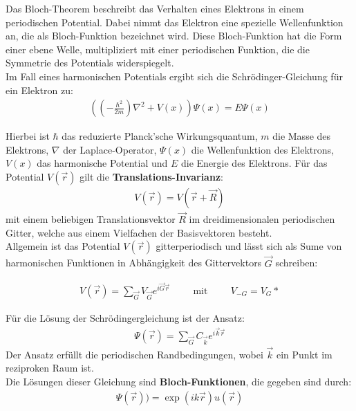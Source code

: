 \label{q:8}
Das Bloch-Theorem beschreibt das Verhalten eines Elektrons in einem periodischen Potential. Dabei nimmt das Elektron eine spezielle Wellenfunktion an, die als Bloch-Funktion bezeichnet wird. Diese Bloch-Funktion hat die Form einer ebene Welle, multipliziert mit einer periodischen Funktion, die die Symmetrie des Potentials widerspiegelt. \\

Im Fall eines harmonischen Potentials ergibt sich die Schrödinger-Gleichung für ein Elektron zu:
\begin{align}
 ((- \frac{\hbar^2}{2m }) \nabla ^2  + V(x)) \Psi (x) = E \Psi (x)
\end{align}

Hierbei ist $\hbar$ das reduzierte Planck'sche Wirkungsquantum, $m$ die Masse des Elektrons, $\nabla$ der Laplace-Operator, $\Psi (x)$ die Wellenfunktion des Elektrons, $V(x)$ das harmonische Potential und $E$ die Energie des Elektrons.
Für das Potential $V(\vec{r})$ gilt die \textbf{Translations-Invarianz}:
\begin{align}
    V(\vec{r}) = V(\vec{r} + \vec{R})
\end{align}
mit einem beliebigen Translationsvektor $\vec{R}$ im dreidimensionalen periodischen Gitter, welche aus einem Vielfachen der Basisvektoren besteht. \\

Allgemein ist das Potential $V(\vec{r})$ gitterperiodisch und lässt sich als Sume von harmonischen Funktionen in Abhängigkeit des Gittervektors $\vec{G}$ schreiben:

\begin{align}
    V(\vec{r}) = \sum_{\vec{G}} V_{\vec{G}} e^{i \vec{G} \vec{r}} \hspace{1cm} \mbox{mit} \hspace{1cm} V_{-G} = V_G*
\end{align}

Für die Lösung der Schrödingergleichung ist der Ansatz:
\begin{align}
    \Psi(\vec{r}) = \sum_{\vec{G}}  C_{\vec{k}} e^{i \vec{k} \vec{r}}
\end{align}
Der Ansatz erfüllt die periodischen Randbedingungen, wobei $\vec{k}$ ein Punkt im reziproken Raum ist. \\

Die Lösungen dieser Gleichung sind \textbf{Bloch-Funktionen}, die gegeben sind durch:
\begin{align}
    \Psi (\vec{r})) = \exp{(ik\vec{r})} u(\vec{r})
\end{align}

